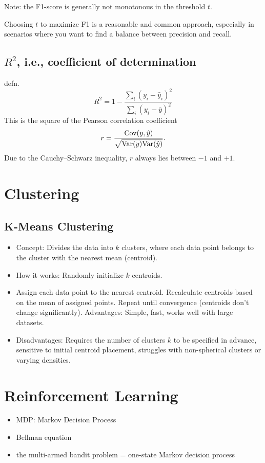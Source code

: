 \documentclass[twoside,11pt]{article}
\begin{document}
Note: the F1-score is generally not monotonous in the threshold $t$.

Choosing $t$ to maximize F1 is a reasonable and common approach, especially in scenarios where you want to find a balance between precision and recall.

\subsection{\texorpdfstring{$R^2$, i.e., coefficient of determination}{R2, i.e., coefficient of determination}}
defn.
$$ R^2 = 1 - \frac{\sum_i (y_i - \hat y_i)^2}{\sum_i (y_i - \bar y)^2} $$
This is the square of the Pearson correlation coefficient
$$ r = \frac{\mathrm{Cov}(y,\hat y)}{\sqrt{\mathrm{Var}(y) \mathrm{Var}(\hat y)}}. $$
Due to the Cauchy--Schwarz inequality, $r$ always lies between $-1$ and $+1$.

\section{Clustering}
\subsection{K-Means Clustering}
\begin{itemize}
    \item Concept: Divides the data into $k$ clusters, where each data point belongs to the cluster with the nearest mean (centroid).
    \item How it works: Randomly initialize $k$ centroids.
    \item Assign each data point to the nearest centroid. Recalculate centroids based on the mean of assigned points. Repeat until convergence (centroids don't change significantly). Advantages: Simple, fast, works well with large datasets.
    \item Disadvantages: Requires the number of clusters $k$ to be specified in advance, sensitive to initial centroid placement, struggles with non-spherical clusters or varying densities.
\end{itemize}


\section{Reinforcement Learning}
\begin{itemize}
    \item MDP: Markov Decision Process
    \item Bellman equation
    \item the multi-armed bandit problem = one-state Markov decision process
\end{itemize}
\end{document}
